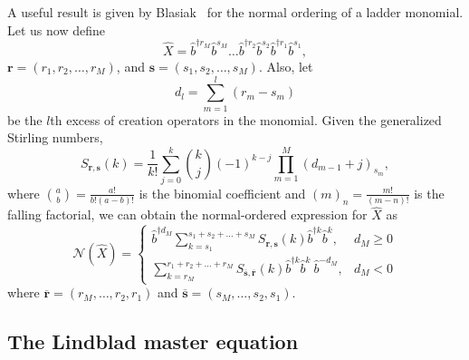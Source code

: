 \documentclass[5p, twocolumn, 10pt, sort&compress]{elsarticle}
\newcounter{bla}
\newcommand{\bop}{\hat{b}}
\newcommand{\bdagn}[1]{\bop^{\dagger {#1}}}
\begin{document}

A useful result is given by Blasiak~\cite{blasiak_combinatorics_2005, Mendez_2005} for the normal ordering of a ladder monomial. Let us now define
\begin{equation}
    \hat{X} = \bdagn{r_M}\bop^{s_M}\dots \bdagn{r_2}\bop^{s_2}\bdagn{r_1}\bop^{s_1} ,
\end{equation} 
$\bm{r}=\left(r_1,r_2,\dots,r_M\right)$, and $\bm{s}=\left(s_1,s_2,\dots,s_M\right)$.  Also, let 
\begin{equation}
    d_l = \sum_{m=1}^l\left(r_m-s_m\right)
\end{equation}
be the $l$th excess of creation operators in the monomial.  Given  the generalized Stirling numbers,
\begin{equation}\label{eq:S_rsk}
    S_{\bm{r},\bm{s}}(k) = \frac{1}{k!}\sum_{j=0}^k \binom{k}{j}\left(-1\right)^{k-j}\prod_{m=1}^M \left(d_{m-1}+j\right)_{s_m},
\end{equation}
where $\binom{a}{b}=\frac{a!}{b!(a-b)!}$ is the binomial coefficient and $(m)_n=\frac{m!}{(m-n)!}$ is the falling factorial, we can obtain the normal-ordered expression for $\hat{X}$ as 
\begin{equation}\label{eq:Blasiak}
    \mathcal{N}\left(\hat{X}\right) = 
    \begin{cases}\displaystyle
        \bdagn{d_M}\sum_{k=s_1}^{s_1+s_2+\dots+s_M} S_{\bm{r},\bm{s}}(k)\bdagn{k}\bop^k,
        &
        d_M \geq 0
        \\
        \displaystyle
        \sum_{k=r_M}^{r_1+r_2+\dots+r_M} S_{\overline{\bm{s}},\overline{\bm{r}}}(k)\bdagn{k}\bop^k\ \bop^{-d_M},
        &
        d_M<0
    \end{cases}
\end{equation}
where $\overline{\bm{r}}=\left(r_M,\dots,r_2,r_1\right)$ and $\overline{\bm{s}}=\left(s_M,\dots,s_2,s_1\right)$. 


\subsection{The Lindblad master equation}\label{subsec:LindbladME}
\end{document}
